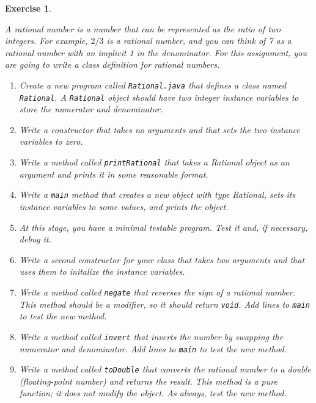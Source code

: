 \documentclass[12pt]{book}
\theoremstyle{exercise}
\newtheorem{exercise}{Exercise}[chapter]
\begin{document}
\begin{exercise}
\label{ex.rational}

A rational number is a number that can be represented as the ratio of
two integers.  For example, $2/3$ is a rational number, and you can
think of 7 as a rational number with an implicit 1 in the denominator.
For this assignment, you are going to write a class definition for
rational numbers.

\begin{enumerate}

\item Create a new program called {\tt Rational.java} that defines a
class named {\tt Rational}.  A {\tt Rational} object should have two
integer instance variables to store the numerator and denominator.

\item Write a constructor that takes no arguments and that sets the
two instance variables to zero.

\item Write a method called {\tt printRational} that takes
a Rational object as an argument and prints it in some
reasonable format.

\item Write a {\tt main} method that creates a new object with
type Rational, sets its instance variables to some values, and prints
the object.

\item At this stage, you have a minimal testable
program.  Test it and, if necessary, debug it.

\item Write a second constructor for your class that takes two
arguments and that uses them to initalize the instance
variables.

\item Write a method called {\tt negate} that reverses the sign of
a rational number.  This method should be a modifier, so it should
return {\tt void}.  Add lines to {\tt main} to test the new method.

\item Write a method called {\tt invert} that inverts the number by
  swapping the numerator and denominator.  Add lines to {\tt main} to
  test the new method.

\item Write a method called {\tt toDouble} that converts the rational
number to a double (floating-point number) and returns the result.
This method is a pure function; it does not modify the object.
As always, test the new method.


\end{enumerate}
\end{exercise}
\end{document}
